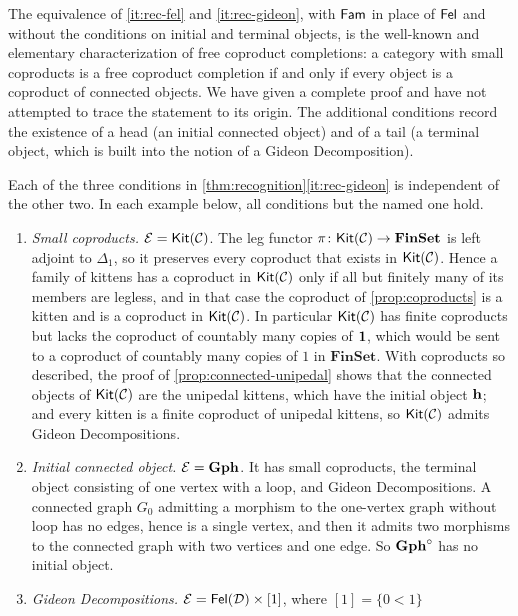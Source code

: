 \begin{remark}\label{rem:recognition-honest}
The equivalence of \ref{it:rec-fel} and \ref{it:rec-gideon}, with $\mathsf{Fam}$ in place
of $\mathsf{Fel}$ and without the conditions on initial and terminal objects, is the
well-known and elementary characterization of free coproduct completions: a
category with small coproducts is a free coproduct completion if and only if
every object is a coproduct of connected objects. We have given a complete
proof and have not attempted to trace the statement to its origin. The
additional conditions record the existence of a head (an initial connected
object) and of a tail (a terminal object, which is built into the notion of a
Gideon Decomposition).
\end{remark}

\begin{counterexample}\label{cex:recognition}
Each of the three conditions in \cref{thm:recognition}\ref{it:rec-gideon} is
independent of the other two. In each example below, all conditions but the
named one hold.
\begin{enumerate}
\item \emph{Small coproducts.} $\mathcal{E}=\mathsf{Kit}(\mathcal{C})$. The leg functor
  $\pi\colon\mathsf{Kit}(\mathcal{C})\to\mathbf{FinSet}$ is left adjoint to $\Delta_1$, so it
  preserves every coproduct that exists in $\mathsf{Kit}(\mathcal{C})$. Hence a family of kittens
  has a coproduct in $\mathsf{Kit}(\mathcal{C})$ only if all but finitely many of its members are
  legless, and in that case the coproduct of \cref{prop:coproducts} is a kitten
  and is a coproduct in $\mathsf{Kit}(\mathcal{C})$. In particular $\mathsf{Kit}(\mathcal{C})$ has finite
  coproducts but lacks the coproduct of countably many copies of $\mathbf{1}$, which
  would be sent to a coproduct of countably many copies of $1$ in
  $\mathbf{FinSet}$. With coproducts so described, the proof of
  \cref{prop:connected-unipedal} shows that the connected objects of $\mathsf{Kit}(\mathcal{C})$
  are the unipedal kittens, which have the initial object $\mathbf{h}$; and every
  kitten is a finite coproduct of unipedal kittens, so $\mathsf{Kit}(\mathcal{C})$ admits Gideon
  Decompositions.
\item \emph{Initial connected object.} $\mathcal{E}=\mathbf{Gph}$. It has small coproducts, the
  terminal object consisting of one vertex with a loop, and Gideon
  Decompositions. A connected graph $G_0$ admitting a morphism to the one-vertex
  graph without loop has no edges, hence is a single vertex, and then it admits
  two morphisms to the connected graph with two vertices and one edge. So
  $\mathbf{Gph}^\circ$ has no initial object.
\item \emph{Gideon Decompositions.} $\mathcal{E}=\mathsf{Fel}(\mathcal{D})\times[1]$, where $[1]=\{0<1\}$

\end{enumerate}
\end{counterexample}
